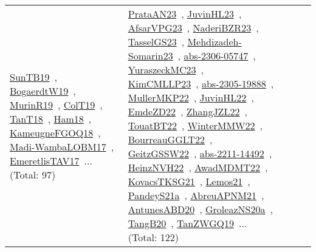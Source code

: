 {\begin{longtable}{lp{3cm}>{\raggedright\arraybackslash}p{6cm}>{\raggedright\arraybackslash}p{6cm}>{\raggedright\arraybackslash}p{8cm}}
\href{../works/SunTB19.pdf}{SunTB19}~\cite{SunTB19}, \href{../works/BogaerdtW19.pdf}{BogaerdtW19}~\cite{BogaerdtW19}, \href{../works/MurinR19.pdf}{MurinR19}~\cite{MurinR19}, \href{../works/ColT19.pdf}{ColT19}~\cite{ColT19}, \href{../works/TanT18.pdf}{TanT18}~\cite{TanT18}, \href{../works/Ham18.pdf}{Ham18}~\cite{Ham18}, \href{../works/KameugneFGOQ18.pdf}{KameugneFGOQ18}~\cite{KameugneFGOQ18}, \href{../works/Madi-WambaLOBM17.pdf}{Madi-WambaLOBM17}~\cite{Madi-WambaLOBM17}, \href{../works/EmeretlisTAV17.pdf}{EmeretlisTAV17}~\cite{EmeretlisTAV17}... (Total: 97) & \href{../works/PrataAN23.pdf}{PrataAN23}~\cite{PrataAN23}, \href{../works/JuvinHL23.pdf}{JuvinHL23}~\cite{JuvinHL23}, \href{../works/AfsarVPG23.pdf}{AfsarVPG23}~\cite{AfsarVPG23}, \href{../works/NaderiBZR23.pdf}{NaderiBZR23}~\cite{NaderiBZR23}, \href{../works/TasselGS23.pdf}{TasselGS23}~\cite{TasselGS23}, \href{../works/Mehdizadeh-Somarin23.pdf}{Mehdizadeh-Somarin23}~\cite{Mehdizadeh-Somarin23}, \href{../works/abs-2306-05747.pdf}{abs-2306-05747}~\cite{abs-2306-05747}, \href{../works/YuraszeckMC23.pdf}{YuraszeckMC23}~\cite{YuraszeckMC23}, \href{../works/KimCMLLP23.pdf}{KimCMLLP23}~\cite{KimCMLLP23}, \href{../works/abs-2305-19888.pdf}{abs-2305-19888}~\cite{abs-2305-19888}, \href{../works/MullerMKP22.pdf}{MullerMKP22}~\cite{MullerMKP22}, \href{../works/JuvinHL22.pdf}{JuvinHL22}~\cite{JuvinHL22}, \href{../works/EmdeZD22.pdf}{EmdeZD22}~\cite{EmdeZD22}, \href{../works/ZhangJZL22.pdf}{ZhangJZL22}~\cite{ZhangJZL22}, \href{../works/TouatBT22.pdf}{TouatBT22}~\cite{TouatBT22}, \href{../works/WinterMMW22.pdf}{WinterMMW22}~\cite{WinterMMW22}, \href{../works/BourreauGGLT22.pdf}{BourreauGGLT22}~\cite{BourreauGGLT22}, \href{../works/GeitzGSSW22.pdf}{GeitzGSSW22}~\cite{GeitzGSSW22}, \href{../works/abs-2211-14492.pdf}{abs-2211-14492}~\cite{abs-2211-14492}, \href{../works/HeinzNVH22.pdf}{HeinzNVH22}~\cite{HeinzNVH22}, \href{../works/AwadMDMT22.pdf}{AwadMDMT22}~\cite{AwadMDMT22}, \href{../works/KovacsTKSG21.pdf}{KovacsTKSG21}~\cite{KovacsTKSG21}, \href{../works/Lemos21.pdf}{Lemos21}~\cite{Lemos21}, \href{../works/PandeyS21a.pdf}{PandeyS21a}~\cite{PandeyS21a}, \href{../works/AbreuAPNM21.pdf}{AbreuAPNM21}~\cite{AbreuAPNM21}, \href{../works/AntunesABD20.pdf}{AntunesABD20}~\cite{AntunesABD20}, \href{../works/GroleazNS20a.pdf}{GroleazNS20a}~\cite{GroleazNS20a}, \href{../works/TangB20.pdf}{TangB20}~\cite{TangB20}, \href{../works/TanZWGQ19.pdf}{TanZWGQ19}~\cite{TanZWGQ19}... (Total: 122)\\

\end{longtable}}
